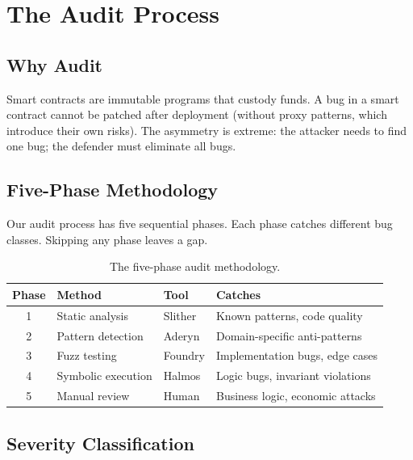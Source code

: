 \section{The Audit Process}


\subsection{Why Audit}

Smart contracts are immutable programs that custody funds. A bug in a smart contract
cannot be patched after deployment (without proxy patterns, which introduce their own
risks). The asymmetry is extreme: the attacker needs to find one bug; the defender must
eliminate all bugs.

\subsection{Five-Phase Methodology}

Our audit process has five sequential phases. Each phase catches different bug classes.
Skipping any phase leaves a gap.

\begin{table}[H]
\centering
\small
\begin{tabular}{@{}clll@{}}
\toprule
\textbf{Phase} & \textbf{Method} & \textbf{Tool} & \textbf{Catches} \\
\midrule
1 & Static analysis & Slither & Known patterns, code quality \\
2 & Pattern detection & Aderyn & Domain-specific anti-patterns \\
3 & Fuzz testing & Foundry & Implementation bugs, edge cases \\
4 & Symbolic execution & Halmos & Logic bugs, invariant violations \\
5 & Manual review & Human & Business logic, economic attacks \\
\bottomrule
\end{tabular}
\caption{The five-phase audit methodology.}
\end{table}

\subsection{Severity Classification}

